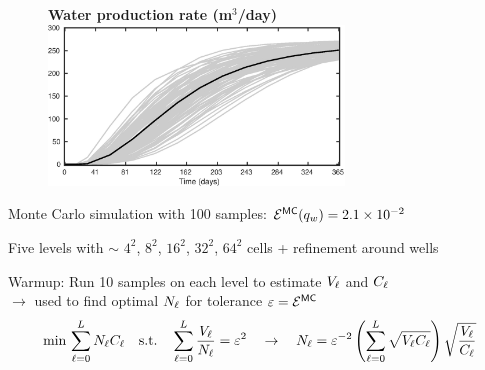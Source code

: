 \begin{frame}{\name{}}
    \begin{figure}
        \centering
        \textbf{Water production rate (m$^3$/day)}
        \includegraphics[width = 0.7\textwidth]{figures/example-2/water-rate.eps}
    \end{figure}
    \begin{squarelist}
        \item Monte Carlo simulation with 100 samples: $\mathcal{E}^{\mathsf{MC}}(q_w) = 2.1\times10^{-2}$
    \end{squarelist}
\end{frame}

\begin{frame}{\name{}}
    \begin{figure}
        \centering
    \end{figure}
    \begin{squarelist}
        \item<1-> Five levels with $\sim$ $4^2$, $8^2$, $16^2$, $32^2$, $64^2$ cells + refinement around wells
        \item<2-> Warmup: Run 10 samples on each level to estimate $V_\ell$ and $C_\ell$ \\
        $\rightarrow$ used to find optimal $N_\ell$ for tolerance $\varepsilon = \mathcal{E}^{{\mathsf{MC}}}$
         \begin{equation*}
            \min\, \sum_{\ell = 0}^L N_\ell C_\ell \quad \text{s.t.} \quad \sum_{\ell = 0}^L\frac{V_\ell}{N_\ell} = \varepsilon^2 \quad \rightarrow \quad N_\ell = \varepsilon^{-2}\left(\sum_{\ell = 0}^L \sqrt{V_\ell C_\ell}\right)\sqrt{\frac{V_\ell}{C_\ell}}
        \end{equation*}
    \end{squarelist}
\end{frame}

